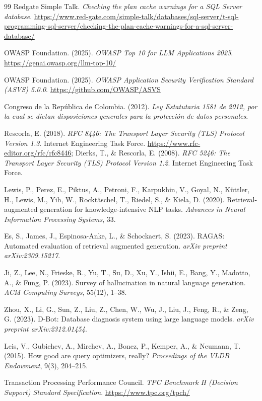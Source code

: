 \documentclass[11pt,a4paper]{report}
\begin{document}
\begin{thebibliography}{99}
 Redgate Simple Talk. \textit{Checking the plan cache warnings for a SQL Server database}. \url{https://www.red-gate.com/simple-talk/databases/sql-server/t-sql-programming-sql-server/checking-the-plan-cache-warnings-for-a-sql-server-database/}

 OWASP Foundation. (2025). \textit{OWASP Top 10 for LLM Applications 2025}. \url{https://genai.owasp.org/llm-top-10/}

 OWASP Foundation. (2025). \textit{OWASP Application Security Verification Standard (ASVS) 5.0.0}. \url{https://github.com/OWASP/ASVS}

 Congreso de la Rep\'ublica de Colombia. (2012). \textit{Ley Estatutaria 1581 de 2012, por la cual se dictan disposiciones generales para la protecci\'on de datos personales}.

 Rescorla, E. (2018). \textit{RFC 8446: The Transport Layer Security (TLS) Protocol Version 1.3}. Internet Engineering Task Force. \url{https://www.rfc-editor.org/rfc/rfc8446}; Dierks, T., \& Rescorla, E. (2008). \textit{RFC 5246: The Transport Layer Security (TLS) Protocol Version 1.2}. Internet Engineering Task Force.

 Lewis, P., Perez, E., Piktus, A., Petroni, F., Karpukhin, V., Goyal, N., K\"uttler, H., Lewis, M., Yih, W., Rockt\"aschel, T., Riedel, S., \& Kiela, D. (2020). Retrieval-augmented generation for knowledge-intensive NLP tasks. \textit{Advances in Neural Information Processing Systems}, 33.

 Es, S., James, J., Espinosa-Anke, L., \& Schockaert, S. (2023). RAGAS: Automated evaluation of retrieval augmented generation. \textit{arXiv preprint arXiv:2309.15217}.

 Ji, Z., Lee, N., Frieske, R., Yu, T., Su, D., Xu, Y., Ishii, E., Bang, Y., Madotto, A., \& Fung, P. (2023). Survey of hallucination in natural language generation. \textit{ACM Computing Surveys}, 55(12), 1--38.

 Zhou, X., Li, G., Sun, Z., Liu, Z., Chen, W., Wu, J., Liu, J., Feng, R., \& Zeng, G. (2023). D-Bot: Database diagnosis system using large language models. \textit{arXiv preprint arXiv:2312.01454}.

 Leis, V., Gubichev, A., Mirchev, A., Boncz, P., Kemper, A., \& Neumann, T. (2015). How good are query optimizers, really? \textit{Proceedings of the VLDB Endowment}, 9(3), 204--215.

 Transaction Processing Performance Council. \textit{TPC Benchmark H (Decision Support) Standard Specification}. \url{https://www.tpc.org/tpch/}


\end{thebibliography}
\end{document}
